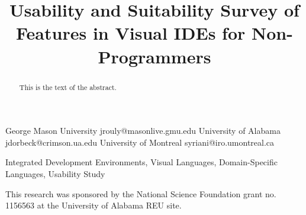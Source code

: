 \documentclass[10pt,preprint]{sigplanconf}
\begin{document}
\setlength{\pdfpageheight}{\paperheight}
\setlength{\pdfpagewidth}{\paperwidth}






\title{Usability and Suitability Survey of Features in Visual IDEs for Non-Programmers}

           {George Mason University}
           {jrouly@masonlive.gmu.edu}
           {University of Alabama}
           {jdorbeck@crimson.ua.edu}
           {University of Montreal}
           {syriani@iro.umontreal.ca}

\maketitle

\begin{abstract}
This is the text of the abstract.
\end{abstract}



\keywords
Integrated Development Environments, Visual Languages, Domain-Specific
Languages, Usability Study














\acks

This research was sponsored by the National Science Foundation grant no. 1156563 at the University of Alabama REU site.



\end{document}
